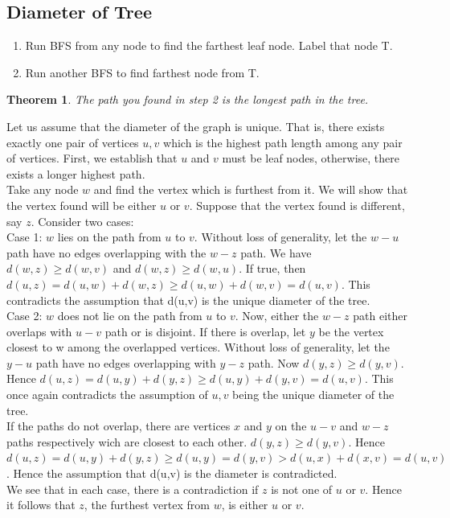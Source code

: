 \documentclass[]{book}
\makeatletter
\newtheorem{theorem}{Theorem}[chapter]
\renewenvironment{proof}[1][\proofname] {\par\pushQED{\qed}\normalfont\topsep6\p@\@plus6\p@\relax\trivlist\item[\hskip\labelsep\bfseries#1\@addpunct{.}]\ignorespaces}{\popQED\endtrivlist\@endpefalse}
\makeatother
\begin{document}
      \subsection{Diameter of Tree}
      \begin{enumerate}
        \item Run BFS from any node to find the farthest leaf node. Label that node T.
        \item Run another BFS to find farthest node from T.
      \end{enumerate}
      \begin{theorem}
        The path you found in step 2 is the longest path in the tree.
      \end{theorem}
      \begin{proof}
        Let us assume that the diameter of the graph is unique. That is, there exists exactly
        one pair of vertices ${u,v}$ which is the highest path length among any pair of vertices.
        First, we establish that $u$ and $v$ must be leaf nodes, otherwise, there exists a
        longer highest path.\\
        \indent{}Take any node $w$ and find the vertex which is furthest from it. We will show that the vertex
        found will be either $u$ or $v$. Suppose that the vertex found is different, say $z$.
        Consider two cases:\\
        \indent{}Case 1: $w$ lies on the path from $u$ to $v$.
        Without loss of generality, let the $w-u$ path have no edges overlapping with the $w-z$ path.
        We have $d(w,z) \geq d(w,v)$ and $d(w,z) \geq d(w,u)$. If true, then $d(u,z) = d(u,w) + d(w,z)
        \geq d(u,w) + d(w,v) = d(u,v)$. This contradicts the assumption that d(u,v) is the unique diameter of the
        tree.\\
        \indent{}Case 2: $w$ does not lie on the path from $u$ to $v$. Now, either the $w-z$ path
        either overlaps with $u-v$ path or is disjoint. If there is overlap, let $y$ be the vertex
        closest to w among the overlapped vertices. Without loss of generality, let the $y-u$ path
        have no edges overlapping with $y-z$ path. Now $d(y,z) \geq d(y,v).$ Hence $d(u,z) = d(u,y) + d(y,z)
        \geq d(u,y) + d(y,v) = d(u,v)$. This once again contradicts the assumption of ${u,v}$ being the
        unique diameter of the tree.\\
        \indent{}If the paths do not overlap, there are vertices $x$ and $y$ on the $u-v$ and $w-z$ paths
        respectively wich are closest to each other. $d(y,z) \geq d(y,v)$. Hence $d(u,z) = d(u,y) + d(y,z)
        \geq d(u,y) = d(y,v) > d(u,x) + d(x,v) = d(u,v)$. Hence the assumption that d(u,v) is the diameter
        is contradicted.\\
        \indent{}We see that in each case, there is a contradiction if $z$ is not one of $u$ or $v$. Hence it follows
        that $z$, the furthest vertex from $w$, is either $u$ or $v$.
      \end{proof}
\end{document}
